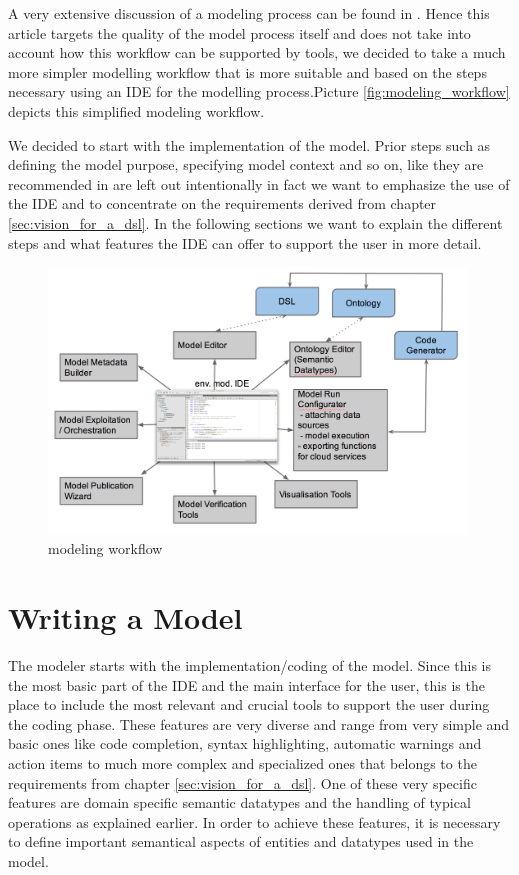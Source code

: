 A very extensive discussion of a modeling process can be found in \autocite{Jakeman2006602}. Hence this article targets the quality of the model process itself and does not take into account how this workflow can be supported by tools, we decided to take a much more simpler modelling workflow that is more suitable and based on the steps necessary using an IDE for the modelling process.Picture \ref{fig:modeling_workflow} depicts this simplified modeling workflow.


We decided to start with the implementation of the model. Prior steps such as defining the model purpose, specifying model context and so on, like they are recommended in \autocite{Jakeman2006602} are left out intentionally in fact we want to emphasize the use of the IDE and to concentrate on the requirements derived from chapter \ref{sec:vision_for_a_dsl}. In the following sections we want to explain the different steps and what features the IDE can offer to support the user in more detail. 

\begin{figure}[h]
	\centering
	\includegraphics[width=0.99\textwidth]{pics/toolchain/toolchain.png}
	\caption{modeling workflow \label{fig:toolchain}}	
\end{figure}


\section{Writing a Model} \label{sec:writing_a_model}
The modeler starts with the implementation/coding of the model. Since this is the most basic part of the IDE and the main interface for the user, this is the place to include the most relevant and crucial tools to support the user during the coding phase. These features are very diverse and range from very simple and basic ones like code completion, syntax highlighting, automatic warnings and action items to much more complex and specialized ones that belongs to the requirements from chapter \ref{sec:vision_for_a_dsl}. One of these very specific features are domain specific semantic datatypes and the handling of typical operations as explained earlier. In order to achieve these features, it is necessary to define important semantical aspects of entities and datatypes used in the model.


